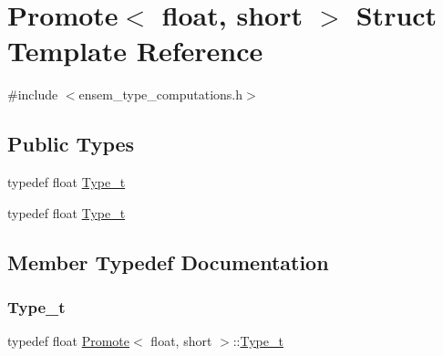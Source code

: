 \hypertarget{structPromote_3_01float_00_01short_01_4}{}\section{Promote$<$ float, short $>$ Struct Template Reference}
\label{structPromote_3_01float_00_01short_01_4}


{\ttfamily \#include $<$ensem\+\_\+type\+\_\+computations.\+h$>$}

\subsection*{Public Types}
\begin{DoxyCompactItemize}
\item 
typedef float \mbox{\hyperlink{structPromote_3_01float_00_01short_01_4_a9c8232afdf3f68f947e67d59a16fd670}{Type\+\_\+t}}
\item 
typedef float \mbox{\hyperlink{structPromote_3_01float_00_01short_01_4_a9c8232afdf3f68f947e67d59a16fd670}{Type\+\_\+t}}
\end{DoxyCompactItemize}


\subsection{Member Typedef Documentation}
\mbox{\label{structPromote_3_01float_00_01short_01_4_a9c8232afdf3f68f947e67d59a16fd670}} 
\subsubsection{\texorpdfstring{Type\_t}{Type\_t}\hspace{0.1cm}{\footnotesize\ttfamily [1/2]}}
{\footnotesize\ttfamily typedef float \mbox{\hyperlink{structPromote}{Promote}}$<$ float, short $>$\+::\mbox{\hyperlink{structPromote_3_01float_00_01short_01_4_a9c8232afdf3f68f947e67d59a16fd670}{Type\+\_\+t}}}

\mbox{\label{structPromote_3_01float_00_01short_01_4_a9c8232afdf3f68f947e67d59a16fd670}} 
